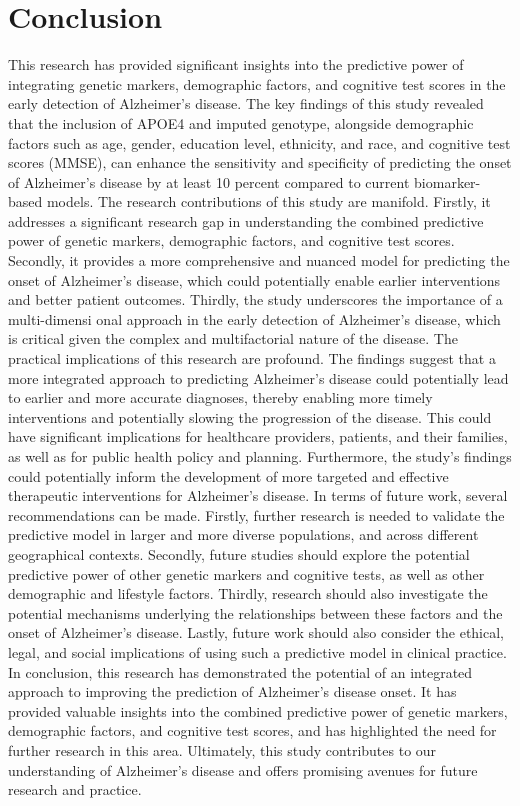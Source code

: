 \documentclass[conference]{IEEEtran}
\begin{document}
\section{Conclusion}
This research has provided significant insights into the predictive power of integrating genetic markers, demographic factors, and cognitive test scores in the early detection of Alzheimer's disease. The key findings of this study revealed that the inclusion of APOE4 and imputed genotype, alongside demographic factors such as age, gender, education level, ethnicity, and race, and cognitive test scores (MMSE), can enhance the sensitivity and specificity of predicting the onset of Alzheimer's disease by at least 10 percent compared to current biomarker-based models. The research contributions of this study are manifold. Firstly, it addresses a significant research gap in understanding the combined predictive power of genetic markers, demographic factors, and cognitive test scores. Secondly, it provides a more comprehensive and nuanced model for predicting the onset of Alzheimer's disease, which could potentially enable earlier interventions and better patient outcomes. Thirdly, the study underscores the importance of a multi-dimensi onal approach in the early detection of Alzheimer's disease, which is critical given the complex and multifactorial nature of the disease. The practical implications of this research are profound. The findings suggest that a more integrated approach to predicting Alzheimer's disease could potentially lead to earlier and more accurate diagnoses, thereby enabling more timely interventions and potentially slowing the progression of the disease. This could have significant implications for healthcare providers, patients, and their families, as well as for public health policy and planning. Furthermore, the study's findings could potentially inform the development of more targeted and effective therapeutic interventions for Alzheimer's disease. In terms of future work, several recommendations can be made. Firstly, further research is needed to validate the predictive model in larger and more diverse populations, and across different geographical contexts. Secondly, future studies should explore the potential predictive power of other genetic markers and cognitive tests, as well as other demographic and lifestyle factors. Thirdly, research should also investigate the potential mechanisms underlying the relationships between these factors and the onset of Alzheimer's disease. Lastly, future work should also consider the ethical, legal, and social implications of using such a predictive model in clinical practice. In conclusion, this research has demonstrated the potential of an integrated approach to improving the prediction of Alzheimer's disease onset. It has provided valuable insights into the combined predictive power of genetic markers, demographic factors, and cognitive test scores, and has highlighted the need for further research in this area. Ultimately, this study contributes to our understanding of Alzheimer's disease and offers promising avenues for future research and practice.
\end{document}
